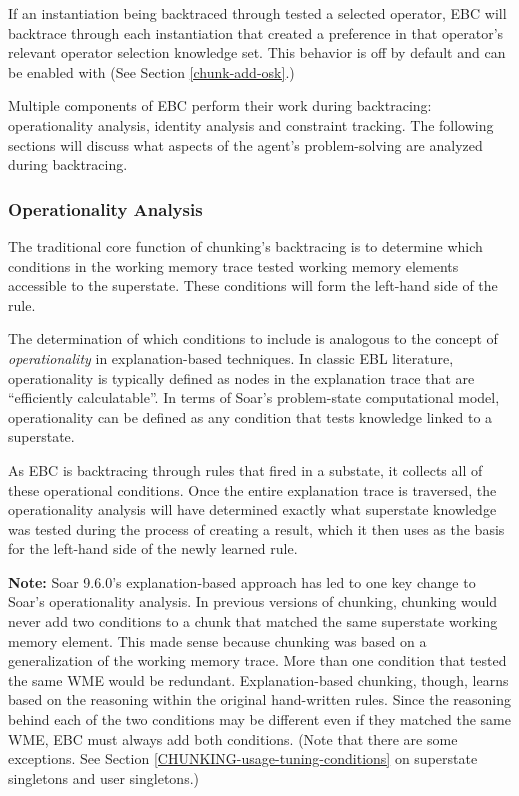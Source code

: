If an instantiation being backtraced through tested a selected operator, EBC will backtrace through each instantiation that created a preference in that operator's relevant operator selection knowledge set.  This behavior is off by default and can be enabled with  (See Section \ref{chunk-add-osk}.)

Multiple components of EBC perform their work during backtracing:  operationality analysis, identity analysis and constraint tracking.  The following sections will discuss what aspects of the agent's problem-solving are analyzed during backtracing.

\subsubsection{Operationality Analysis}
\label{CHUNKING-during-backtracing-operationality}

The traditional core function of chunking's backtracing is to determine which conditions in the working memory trace tested working memory elements accessible to the superstate.  These conditions will form the left-hand side of the rule.

The determination of which conditions to include is analogous to the concept of \textit{operationality} in explanation-based techniques. In classic EBL literature, operationality is typically defined as nodes in the explanation trace that are ``efficiently calculatable''.  In terms of Soar's problem-state computational model, operationality can be defined as any condition that tests knowledge linked to a superstate.

As EBC is backtracing through rules that fired in a substate, it collects all of these operational conditions. Once the entire explanation trace is traversed, the operationality analysis will have determined exactly what superstate knowledge was tested during the process of creating a result, which it then uses as the basis for the left-hand side of the newly learned rule.

\textbf{Note:} Soar 9.6.0's explanation-based approach has led to one key change to Soar's operationality analysis.  In previous versions of chunking, chunking would never add two conditions to a chunk that matched the same superstate working memory element.  This made sense because chunking was based on a generalization of the working memory trace.  More than one condition that tested the same WME would be redundant.  Explanation-based chunking, though, learns based on the reasoning within the original hand-written rules.  Since the reasoning behind each of the two conditions may be different even if they matched the same WME, EBC must always add both conditions.  (Note that there are some exceptions. See Section \ref{CHUNKING-usage-tuning-conditions} on superstate singletons and user singletons.)

